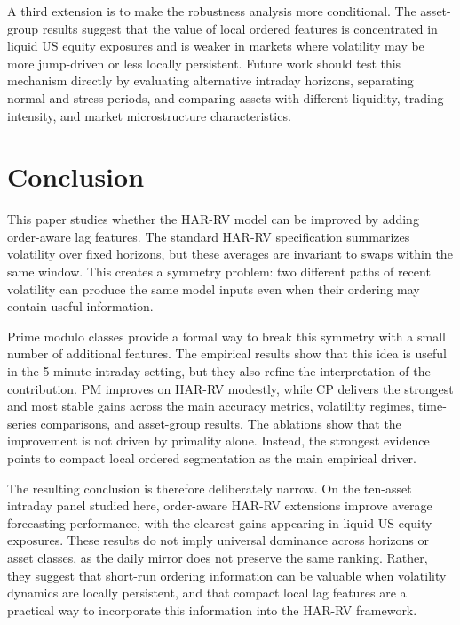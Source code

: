 ﻿\documentclass[11pt,a4paper]{article}
\renewcommand{\thesection}{\Roman{section}.}
\begin{document}
\noindent
A third extension is to make the robustness analysis more conditional. The asset-group results suggest that the value of local ordered features is concentrated in liquid US equity exposures and is weaker in markets where volatility may be more jump-driven or less locally persistent. Future work should test this mechanism directly by evaluating alternative intraday horizons, separating normal and stress periods, and comparing assets with different liquidity, trading intensity, and market microstructure characteristics.

\section{Conclusion}

\noindent
This paper studies whether the HAR-RV model can be improved by adding order-aware lag features. The standard HAR-RV specification summarizes volatility over fixed horizons, but these averages are invariant to swaps within the same window. This creates a symmetry problem: two different paths of recent volatility can produce the same model inputs even when their ordering may contain useful information.

\noindent
Prime modulo classes provide a formal way to break this symmetry with a small number of additional features. The empirical results show that this idea is useful in the 5-minute intraday setting, but they also refine the interpretation of the contribution. PM improves on HAR-RV modestly, while CP delivers the strongest and most stable gains across the main accuracy metrics, volatility regimes, time-series comparisons, and asset-group results. The ablations show that the improvement is not driven by primality alone. Instead, the strongest evidence points to compact local ordered segmentation as the main empirical driver.

\noindent
The resulting conclusion is therefore deliberately narrow. On the ten-asset intraday panel studied here, order-aware HAR-RV extensions improve average forecasting performance, with the clearest gains appearing in liquid US equity exposures. These results do not imply universal dominance across horizons or asset classes, as the daily mirror does not preserve the same ranking. Rather, they suggest that short-run ordering information can be valuable when volatility dynamics are locally persistent, and that compact local lag features are a practical way to incorporate this information into the HAR-RV framework.

\newpage
\appendix
\renewcommand{\thesection}{Appendix \Alph{section}}
\end{document}
